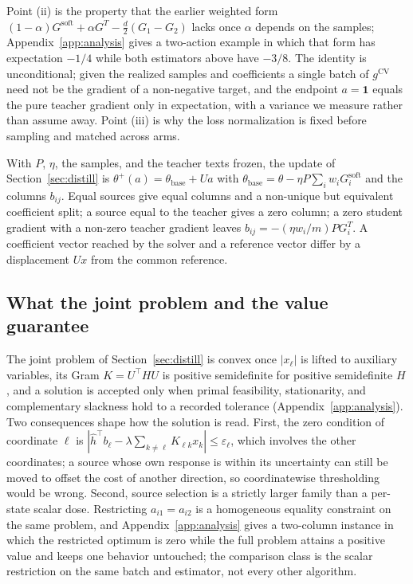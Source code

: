 Point (ii) is the property that the earlier weighted form
$(1-\alpha)G^{\mathrm{soft}}+\alpha G^T-\tfrac{d}{2}(G_1-G_2)$ lacks
once $\alpha$ depends on the samples; Appendix~\ref{app:analysis}
gives a two-action example in which that form has expectation $-1/4$
while both estimators above have $-3/8$. The identity is
unconditional; given the realized samples and coefficients a single
batch of $g^{\mathrm{CV}}$ need not be the gradient of a non-negative
target, and the endpoint $a=\mathbf{1}$ equals the pure teacher
gradient only in expectation, with a variance we measure rather than
assume away. Point (iii) is why the loss normalization is fixed before
sampling and matched across arms.

\begin{proposition}\label{prop:affine}
With $P$, $\eta$, the samples, and the teacher texts frozen, the
update of Section~\ref{sec:distill} is
$\theta^{+}(a)=\theta_{\mathrm{base}}+Ua$ with
$\theta_{\mathrm{base}}=\theta-\eta P\sum_i w_iG_i^{\mathrm{soft}}$ and
the columns $b_{ij}$. Equal sources give equal columns and a
non-unique but equivalent coefficient split; a source equal to the
teacher gives a zero column; a zero student gradient with a non-zero
teacher gradient leaves $b_{ij}=-(\eta w_i/m)PG_i^T$. A coefficient
vector reached by the solver and a reference vector differ by a
displacement $Ux$ from the common reference.
\end{proposition}

\subsection{What the joint problem and the value guarantee}\label{sec:theory-acq}
The joint problem of Section~\ref{sec:distill} is convex once
$|x_\ell|$ is lifted to auxiliary variables, its Gram $K=U^{\top}HU$ is
positive semidefinite for positive semidefinite $H$, and a solution
is accepted only when primal feasibility, stationarity, and
complementary slackness hold to a recorded tolerance
(Appendix~\ref{app:analysis}). Two consequences shape how the
solution is read. First, the zero condition of coordinate $\ell$ is
$|\hat h^{\top}b_\ell-\lambda\sum_{k\ne\ell}K_{\ell k}x_k|\le\varepsilon_\ell$,
which involves the other coordinates; a source whose own response is
within its uncertainty can still be moved to offset the cost of
another direction, so coordinatewise thresholding would be wrong.
Second, source selection is a strictly larger family than a per-state
scalar dose. Restricting $a_{i1}=a_{i2}$ is a homogeneous equality
constraint on the same problem, and Appendix~\ref{app:analysis} gives
a two-column instance in which the restricted optimum is zero while
the full problem attains a positive value and keeps one behavior
untouched; the comparison class is the scalar restriction on the same
batch and estimator, not every other algorithm.

